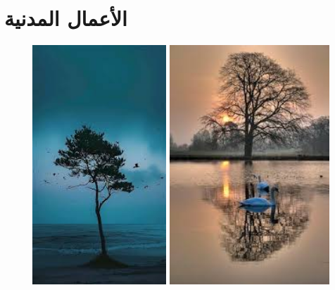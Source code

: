 \documentclass{article}
\begin{document}
\section{الأعمال المدنية}
\begin{figure}[H]
    \centering

    \begin{minipage}{0.45\textwidth}
        \centering
        \includegraphics[height=9cm,width=\textwidth]{civil/1.jpg}
    \end{minipage}
    \hfill
    \begin{minipage}{0.45\textwidth}
        \centering
        \includegraphics[height=9cm,width=\textwidth]{civil/2.jpg}
    \end{minipage}
    \vspace{0.5cm} %


\end{figure}
\end{document}
